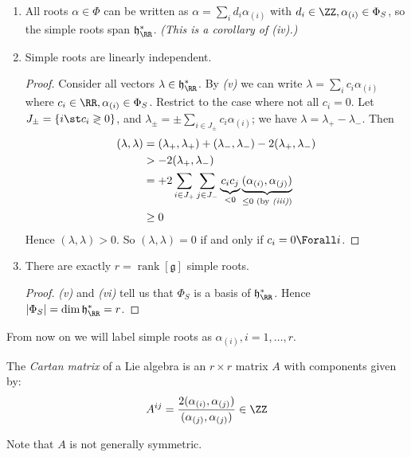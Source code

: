 \documentclass{jknotes}
\begin{document}
\begin{lemma}
\begin{enumerate}[label=(\roman*)]
\begin{proof}
            \end{proof}
        \item All roots \(\alpha \in \Phi\) can be written as \(\alpha = \sum_i d_i \alpha_{(i)}\) with \(d_i \in \ZZ, \alpha_{(i)} \in \Phi_S\), so the simple roots span \(\mathfrak{h}^*_\RR\). \emph{(This is a corollary of \emph{(iv)}.)}
        \item Simple roots are linearly independent.
            \begin{proof}
                Consider all vectors \(\lambda \in \mathfrak{h}^*_\RR\). By \emph{(v)} we can write \(\lambda = \sum_i c_i\alpha_{(i)}\) where \(c_i \in \RR, \alpha_{(i)} \in \Phi_S\). Restrict to the case where not all \(c_i = 0\). Let \(J_\pm = \{i \st c_i \gtrless 0\}\), and \(\lambda_\pm = \pm\sum_{i \in J_\pm}c_i\alpha_{(i)}\); we have \(\lambda = \lambda_+-\lambda_-\). Then 
                \begin{align}
                    (\lambda,\lambda) &= (\lambda_+,\lambda_+) + (\lambda_-,\lambda_-) - 2(\lambda_+,\lambda_-) \\
                    &> -2(\lambda_+,\lambda_-) \\
                    &= +2\sum_{i\in J_+}\sum_{j\in J_-} \underbrace{c_ic_j}_{< 0} \underbrace{(\alpha_{(i)},\alpha_{(j)})}_{\le 0 \text{ (by \emph{(iii)})}} \\
                    & \ge 0
                \end{align}
                Hence \((\lambda,\lambda) > 0\). So \((\lambda,\lambda) = 0\) if and only if \(c_i = 0 \Forall i\).
            \end{proof}
        \item There are exactly \(r=\operatorname{rank}[\mathfrak{g}]\) simple roots.
            \begin{proof}
                \emph{(v)} and \emph{(vi)} tell us that \(\Phi_S\) is a basis of \(\mathfrak{h}^*_\RR\). Hence \(|\Phi_S| = \dim\mathfrak{h}^*_\RR=r\).
            \end{proof}
    \end{enumerate}
\end{lemma}

From now on we will label simple roots as \(\alpha_{(i)}, i=1,\dots,r\).
\begin{defn}
    The \emph{Cartan matrix} of a Lie algebra is an \(r\times r\) matrix \(A\) with components given by:
    \begin{equation}
        A^{ij} = \frac{2(\alpha_{(i)},\alpha_{(j)})}{(\alpha_{(j)},\alpha_{(j)})} \in \ZZ
    \end{equation}
\end{defn}
Note that \(A\) is not generally symmetric.
\end{document}
